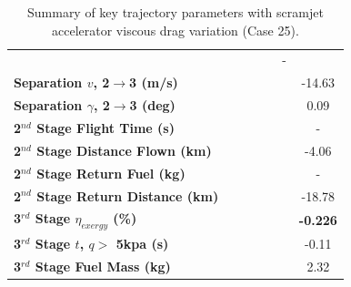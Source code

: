 \begin{table}[ht]
\begin{tabular}{l c c c c c c}
		& \secondthirdSeparationAltvCdFifty
		& \secondthirdSeparationAltvCdStandard
		& \secondthirdSeparationAltvCdOneHundredSeven
		& \secondthirdSeparationAltvCdOneHundredFifteen
		& -
		\\
		\textbf{Separation $v$, 2$\rightarrow$3 (m/s)}
		& \secondthirdSeparationvvCdTwenty
		& \secondthirdSeparationvvCdFifty
		& \secondthirdSeparationvvCdStandard
		& \secondthirdSeparationvvCdOneHundredSeven
		& \secondthirdSeparationvvCdOneHundredFifteen
		&-14.63
		\\
		\textbf{Separation $\gamma$, 2$\rightarrow$3 (deg)}
		& \secondthirdSeparationgammavCdTwenty
		& \secondthirdSeparationgammavCdFifty
		& \secondthirdSeparationgammavCdStandard
		& \secondthirdSeparationgammavCdOneHundredSeven
		& \secondthirdSeparationgammavCdOneHundredFifteen
		&0.09
		\\
		\textbf{2$^{nd}$ Stage Flight Time (s)}
		& \secondFlightTimevCdTwenty
		& \secondFlightTimevCdFifty
		& \secondFlightTimevCdStandard
		& \secondFlightTimevCdOneHundredSeven
		& \secondFlightTimevCdOneHundredFifteen
		& -
		\\
		\textbf{2$^{nd}$ Stage Distance Flown (km)}
		& \SecondDistvCdTwenty
		& \SecondDistvCdFifty
		& \SecondDistvCdStandard
		& \SecondDistvCdOneHundredSeven
		& \SecondDistvCdOneHundredFifteen
		&-4.06
		\\
		\textbf{2$^{nd}$ Stage Return Fuel (kg)}
		& \returnFuelvCdTwenty
		& \returnFuelvCdFifty
		& \returnFuelvCdStandard
		& \returnFuelvCdOneHundredSeven
		& \returnFuelvCdOneHundredFifteen
		& -
		\\
		\textbf{2$^{nd}$ Stage Return Distance (km)}
		& \returnDistvCdTwenty
		& \returnDistvCdFifty
		& \returnDistvCdStandard
		& \returnDistvCdOneHundredSeven
		& \returnDistvCdOneHundredFifteen
		&-18.78
		\\
		\hline 
		\textbf{3$^{rd}$ Stage $\eta_{exergy}$ (\%)}
		& \textbf{\thirddExergyEffvCdTwenty}
		& \textbf{\thirddExergyEffvCdFifty}
		& \textbf{\thirddExergyEffvCdStandard}
		& \textbf{\thirddExergyEffvCdOneHundredSeven}
		& \textbf{\thirddExergyEffvCdOneHundredFifteen}
		& \textbf{-0.226}
		\\
		\textbf{3$^{rd}$ Stage $t$, $q >$ 5kpa (s)}
		& \thirdqOverFivevCdTwenty
		& \thirdqOverFivevCdFifty
		& \thirdqOverFivevCdStandard
		& \thirdqOverFivevCdOneHundredSeven
		& \thirdqOverFivevCdOneHundredFifteen
		&-0.11
		\\
		\textbf{3$^{rd}$ Stage Fuel Mass (kg)}
		& \thirdmFuelvCdTwenty
		& \thirdmFuelvCdFifty
		& \thirdmFuelvCdStandard
		& \thirdmFuelvCdOneHundredSeven
		& \thirdmFuelvCdOneHundredFifteen
		&2.32
		\\
		\hline 
	\end{tabular} 
	\caption{Summary of key trajectory parameters with scramjet accelerator viscous drag variation (Case 25).}
	\label{tab:viscous}
\end{table} 

